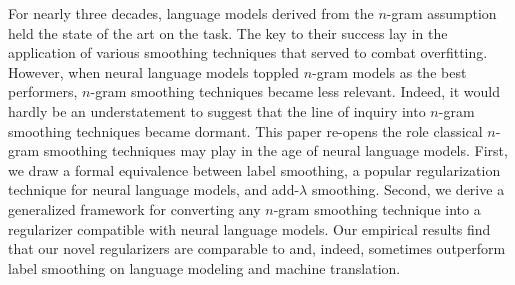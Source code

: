 For nearly three decades, language models derived from the $n$-gram assumption held the state of the art on the task. The key to their success lay in the application of various smoothing techniques that served to combat overfitting. However, when neural language models toppled $n$-gram models as the best performers, $n$-gram smoothing techniques became less relevant. Indeed, it would hardly be an understatement to suggest that the line of inquiry into $n$-gram smoothing techniques became dormant. This paper re-opens the role classical $n$-gram smoothing techniques may play in the age of neural language models. First, we draw a formal equivalence between label smoothing, a popular regularization technique for neural language models, and add-$\lambda$ smoothing. Second, we derive a generalized framework for converting any $n$-gram smoothing technique into a regularizer compatible with neural language models. Our empirical results find that our novel regularizers are comparable to and, indeed, sometimes outperform label smoothing on language modeling and machine translation.